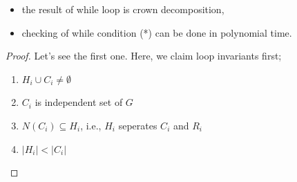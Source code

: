 \documentclass[12pt, a4paper, openany, twoside]{book}
\theoremstyle{definition}
\theoremstyle{remark}
\theoremstyle{plain}
\numberwithin{equation}{section}
\begin{document}
\begin{tcolorbox}[colback=yellow!10!white,colframe=red!75!black,title=Crown Decomposition Algorithm]

    \begin{itemize}
        \item the result of while loop is crown decomposition,
        \item checking of while condition (*) can be done in polynomial time.
    \end{itemize}
    
\end{tcolorbox}

\begin{proof}
    
Let's see the first one. Here, we claim loop invariants first; 
\begin{enumerate}
    \item $H_i \cup C_i \neq \emptyset$
    \item $C_i$ is independent set of $G$
    \item $N(C_i) \subseteq H_i$, i.e., $H_i$ seperates $C_i$ and $R_i$
    \item $|H_i| < |C_i|$
\end{enumerate}


\end{proof}
\end{document}
